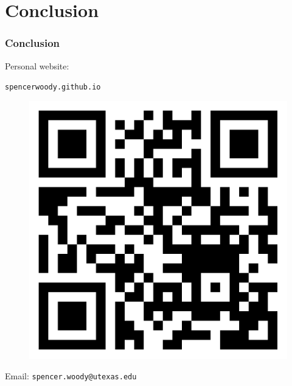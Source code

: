

\section{Conclusion}
\label{sec:conclusion}


\begin{frame}
  \frametitle{Conclusion}

  Personal website:

  \texttt{spencerwoody.github.io}
  \begin{figure}[htp!]
    \centering
    \includegraphics[width=0.4\linewidth]{fig/qrcode.png}
  \end{figure}
  Email: \texttt{spencer.woody@utexas.edu}
  
\end{frame}


